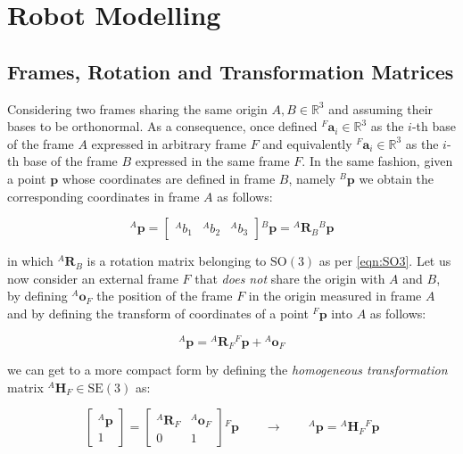 \section{Robot Modelling}

\subsection{Frames, Rotation and Transformation Matrices}

Considering two frames sharing the same origin $A, B \in \mathbb{R}^3$ and assuming their bases to be orthonormal. As a consequence, once defined ${}^F\mathbf{a} _i \in \mathbb{R}^3$ as the $i$-th base of the frame $A$ expressed in arbitrary frame $F$ and equivalently ${}^F\mathbf{a} _i \in \mathbb{R}^3$ as the $i$-th base of the frame $B$ expressed in the same frame $F$. In the same fashion, given a point $\mathbf{p}$ whose coordinates are defined in frame $B$, namely ${}^B\mathbf{p}$ we obtain the corresponding coordinates in frame $A$ as follows:

\begin{equation}
    {}^A\mathbf{p} = \begin{bmatrix} {}^Ab_1 & {}^Ab_2 & {}^Ab_3 \end{bmatrix} {}^B \mathbf{p} = {}^A \mathbf{R}_B {}^B\mathbf{p}
\end{equation}

in which ${}^A\mathbf{R}_B$ is a rotation matrix belonging to $\mathrm{SO}(3)$ as per \cref{eqn:SO3}. Let us now consider an external frame $F$ that \textit{does not} share the origin with $A$ and $B$, by defining ${}^A\mathbf{o}_F$ the position of the frame $F$ in the origin measured in frame $A$ and by defining the transform of coordinates of a point ${}^F\mathbf{p}$ into $A$ as follows:

\begin{equation}
    {}^A \mathbf{p} = {}^A \mathbf{R}_F {}^F \mathbf{p} + {}^A \mathbf{o}_F
\end{equation}

we can get to a more compact form by defining the \textit{homogeneous transformation} matrix ${}^A\mathbf{H}_F \in \mathrm{SE}(3)$ as:

\begin{equation}
    \begin{bmatrix}
        {}^A \mathbf{p} \\ 1
    \end{bmatrix} =
    \begin{bmatrix}
        {}^A \mathbf{R}_F & {}^A \mathbf{o}_F \\ 0 & 1
    \end{bmatrix} {}^F \mathbf{p} \qquad \rightarrow \qquad {}^A\mathbf{p} = {}^A \mathbf{H}_F {}^F \mathbf{p}
\end{equation}

